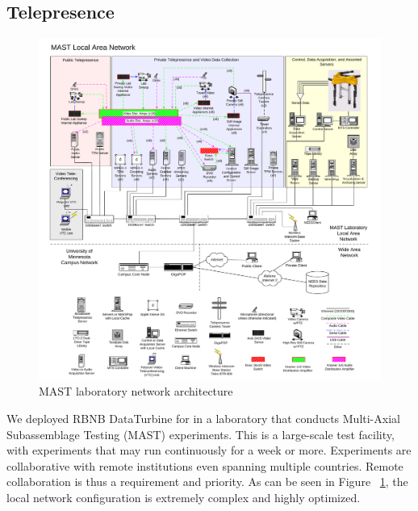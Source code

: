 \subsection{Telepresence}

\begin{figure}
\includegraphics[scale=0.50]{figs/MAST}
\caption{\label{fig:mast-arch}MAST laboratory network architecture}
\end{figure}

We deployed RBNB DataTurbine for in a laboratory that conducts Multi-Axial Subassemblage Testing
(MAST) experiments. This is a large-scale test facility, with experiments that may run continuously for a week or more. Experiments are collaborative with remote institutions even spanning multiple countries.
Remote collaboration is thus a requirement and priority. As can be seen in Figure ~\ref{fig:mast-arch}, the local network configuration is extremely complex and highly optimized. 

